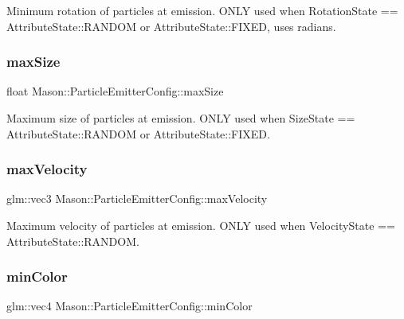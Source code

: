 Minimum rotation of particles at emission. O\+N\+LY used when Rotation\+State == Attribute\+State\+::\+R\+A\+N\+D\+OM or Attribute\+State\+::\+F\+I\+X\+ED, uses radians. 

\hypertarget{struct_mason_1_1_particle_emitter_config_ad8b8933ec9758ed264d1b1ccc3d24bd8}{}\label{struct_mason_1_1_particle_emitter_config_ad8b8933ec9758ed264d1b1ccc3d24bd8} 
\subsubsection{\texorpdfstring{max\+Size}{maxSize}}
{\footnotesize\ttfamily float Mason\+::\+Particle\+Emitter\+Config\+::max\+Size}



Maximum size of particles at emission. O\+N\+LY used when Size\+State == Attribute\+State\+::\+R\+A\+N\+D\+OM or Attribute\+State\+::\+F\+I\+X\+ED. 

\hypertarget{struct_mason_1_1_particle_emitter_config_aa449573ac5e8ae2ef3f5110836a3091c}{}\label{struct_mason_1_1_particle_emitter_config_aa449573ac5e8ae2ef3f5110836a3091c} 
\subsubsection{\texorpdfstring{max\+Velocity}{maxVelocity}}
{\footnotesize\ttfamily glm\+::vec3 Mason\+::\+Particle\+Emitter\+Config\+::max\+Velocity}



Maximum velocity of particles at emission. O\+N\+LY used when Velocity\+State == Attribute\+State\+::\+R\+A\+N\+D\+OM. 

\hypertarget{struct_mason_1_1_particle_emitter_config_aa70f6e44cc9712bf59ef89e1a339726d}{}\label{struct_mason_1_1_particle_emitter_config_aa70f6e44cc9712bf59ef89e1a339726d} 
\subsubsection{\texorpdfstring{min\+Color}{minColor}}
{\footnotesize\ttfamily glm\+::vec4 Mason\+::\+Particle\+Emitter\+Config\+::min\+Color}



